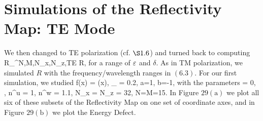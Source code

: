 \vspace{-18mm}

\section{Simulations of the Reflectivity Map: TE Mode}
\label{Sec: Simulations TE Mode}

We then changed to TE polarization (cf. $\S 1.6$) and turned back to computing
\vspace{-0.4mm}
\bes
R_{}^{N,M,N_x,N_z,TE} \approx R,
\ees
\vspace{-0.4mm}
\hspace{-1.5mm}for a range of $\varepsilon$ and $\delta$. As in TM polarization, we simulated $R$ with the frequency/wavelength ranges in $(6.3)$. For our first simulation, we studied
\be
f(x) = \cos(x),
\quad
\varepsilon_{} = 0.2, 
\quad 
a=1,
\quad
b=-1,
\ee
with the parameters
\be
\alpha = 0,
\quad
{},
\quad
n^u = 1,
\quad
n^w = 1.1,
\quad 
N_x = N_z = 32,
\quad
N=M=15.
\ee
In Figure $29(\text{a})$ we plot all six of these subsets of the Reflectivity Map on one set of coordinate axes, and in 
Figure $29(\text{b})$ we plot the Energy Defect.


